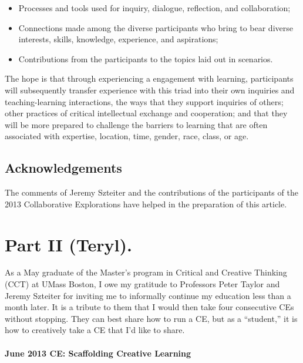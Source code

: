 \begin{itemize}
\tightlist
\item
  Processes and tools used for inquiry, dialogue, reflection, and
  collaboration;
\item
  Connections made among the diverse participants who bring to bear
  diverse interests, skills, knowledge, experience, and aspirations;
\item
  Contributions from the participants to the topics laid out in
  scenarios.
\end{itemize}

The hope is that through experiencing a engagement with learning,
participants will subsequently transfer experience with this triad into
their own inquiries and teaching-learning interactions, the ways that
they support inquiries of others; other practices of critical
intellectual exchange and cooperation; and that they will be more
prepared to challenge the barriers to learning that are often associated
with expertise, location, time, gender, race, class, or age.

\hypertarget{acknowledgements}{%
\subsection{Acknowledgements}\label{acknowledgements}}

The comments of Jeremy Szteiter and the contributions of the
participants of the 2013 Collaborative Explorations have helped in the
preparation of this article.

\hypertarget{part-ii-teryl.}{%
\section{Part II (Teryl).}\label{part-ii-teryl.}}

As a May graduate of the Master's program in Critical and Creative
Thinking (CCT) at UMass Boston, I owe my gratitude to Professors Peter
Taylor and Jeremy Szteiter for inviting me to informally continue my
education less than a month later. It is a tribute to them that I would
then take four consecutive CEs without stopping. They can best share how
to run a CE, but as a ``student,'' it is how to creatively take a CE
that I'd like to share.

\hypertarget{june-2013-ce-scaffolding-creative-learning}{%
\paragraph{June 2013 CE: Scaffolding Creative
Learning}\label{june-2013-ce-scaffolding-creative-learning}}

